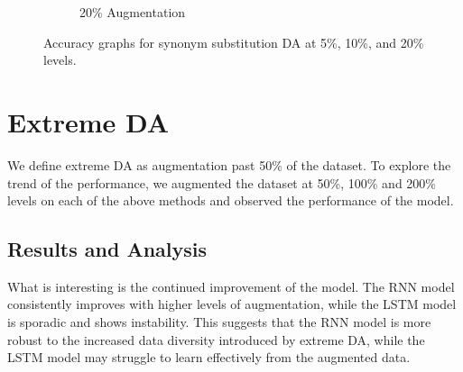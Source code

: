 \documentclass{article}
\begin{document}
\begin{figure}[ht]
\begin{subfigure}[b]{0.3\textwidth}
    \caption{20\% Augmentation}
    \label{fig:synonym_20}
  \end{subfigure}
  \caption{Accuracy graphs for synonym substitution DA at 5\%, 10\%, and 20\% levels.}
  \label{fig:synonym_substitution_acc}
\end{figure}

\section{Extreme DA}

We define extreme DA as augmentation past 50\% of the dataset. To explore the
trend of the performance, we augmented the dataset at 50\%, 100\% and 200\%
levels on each of the above methods and observed the performance of the model.

\subsection{Results and Analysis}

What is interesting is the continued improvement of the model. The RNN model
consistently improves with higher levels of augmentation, while the LSTM model
is sporadic and shows instability. This suggests that the RNN model is more
robust to the increased data diversity introduced by extreme DA, while the LSTM
model may struggle to learn effectively from the augmented data.
\end{document}
